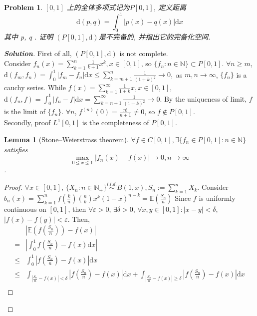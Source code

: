 \documentclass{ctexart}
\newtheorem{problem}{\textbf{Problem}}
\newenvironment{solution}{\begin{proof}[\textbf{Solution}]}{\end{proof}}
\renewcommand{\(}{\left(}
\renewcommand{\)}{\right)}
\renewcommand{\d}{\mathrm{d}}
\newcommand{\N}{\mathbb{N}}
\newcommand{\E}{\mathbb{E}}
\renewcommand{\epsilon}{\varepsilon}
\newtheorem{lemma}{Lemma}
\begin{document}
\newcommand{\intt}[2]{\int_0^1|#1-#2| \mathrm{d} x}
\begin{problem}
  $[0,1]$ 上的全体多项式记为$P[0,1]$, 定义距离
  \begin{equation}
    \d(p, q)=\int_0^1|p(x)-q(x)| \mathrm{d} x
  \end{equation}
  其中 p, q . 证明
  $(P[0,1],\d)$是不完备的, 并指出它的完备化空间.
\end{problem}
\begin{solution}
  First of all, $(P[0,1],\d)$ is not complete.\\
  Consider $f_n(x)=\sum_{k=1}^n \frac{1}{k+1}x^k,x\in [0,1]$, so $\{f_n:n\in \N\}\subset P[0,1]$.
  $\forall n\geq m$, $\d(f_m,f_n)=\intt{f_m}{f_n}\leq \sum_{k=m+1}^n \frac{1}{(1+k)^2}\to0,$ as $m,n\to\infty$, $\{f_n\}$ is a cauchy series.
  While $f(x)=\sum_{k=1}^{\infty}\frac{1}{1+k}x,x\in [0,1]$, $\d(f_n, f)=\intt{f_n}{f}=\sum_{k=n+1}^{\infty}\frac{1}{{(1+k)}^2}\to 0$.
  By the uniqueness of limit, $f$ is the limit of $\{f_n\}$.
  $\forall n$, $f^{(n)}(0)=\frac{n!}{n+1}\neq 0$, so $f\notin P[0,1]$.\\
  Secondly, proof $L^1[0,1]$ is the completeness of $P[0,1]$.
  \begin{lemma}[Stone–Weierstrass theorem]\label{lem:1}
    $\forall f\in C[0,1],\exists \{f_n\in P[0,1]:n\in\N\}$ satisfies
    $$\max_{0\leq x\leq1}|f_n(x)-f(x)|\to 0, n\to\infty$$.
  \end{lemma}
  \begin{proof}
    $\forall x\in[0,1]$, $\{X_n: n\in\N_+\}\stackrel{i.i.d.}{\sim} B(1,x), S_n:=\sum_{k=1}^n X_k$.
    Consider $b_n(x)=\sum_{k=1}^{n}f(\frac{k}{n})\binom{n}{k}x^k(1-x)^{n-k}=\E(\frac{S_n}{n})$
    Since $f$ is uniformly continuous on $[0,1]$,
    then $\forall \epsilon>0$, $\exists \delta>0$, $\forall x,y\in[0,1]:|x-y|<\delta$, $|f(x)-f(y)|<\epsilon$. Then,
    \begin{equation}
      \begin{aligned}
             & |\E(f(\frac{S_n}{n}))-f(x)|                                                                                                    \\
        =    & |\int_0^1f(\frac{S_n}{n})-f(x)\d x|                                                                                            \\
        \leq & \intt{f(\frac{S_n}{n})}{f(x)}                                                                                                  \\
        \leq & \int_{|\frac{S_n}{n}-f(x)|<\delta}|f(\frac{S_n}{n})-f(x)|\d x+\int_{|\frac{S_n}{n}-f(x)|\geq\delta}|f(\frac{S_n}{n})-f(x)|\d x \\

\end{aligned}
\end{equation}
\end{proof}
\end{solution}
\end{document}
